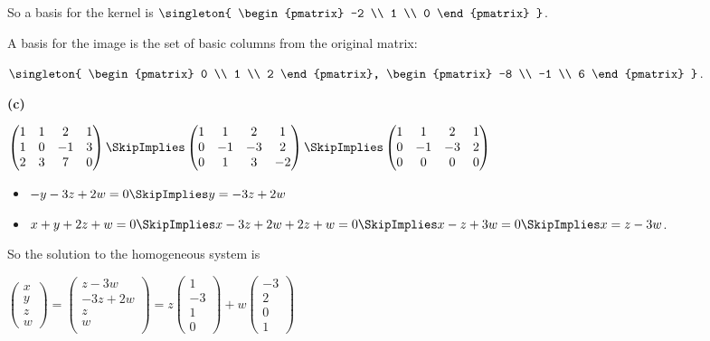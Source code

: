 \documentclass[oneside,12pt]{amsart}
\begin{document}
So a basis for the kernel is
$\singleton{
\begin{pmatrix}
-2 \\ 1 \\ 0
\end{pmatrix}
}$.

A basis for the image is the set of basic columns from the original matrix:

$\singleton{
\begin{pmatrix}
0 \\ 1 \\ 2
\end{pmatrix},
\begin{pmatrix}
-8 \\ -1 \\ 6
\end{pmatrix}
}$.

\bigskip

\textbf{(c)}

\bigskip

$
\begin{pmatrix}
1 & 1 & 2 & 1  \\
1 & 0 & -1 & 3  \\
2 & 3 & 7 & 0
\end{pmatrix}
\SkipImplies
\begin{pmatrix}
1 & 1 & 2 & 1 \\
0 & -1 & -3 & 2  \\
0 & 1 & 3 & -2
\end{pmatrix}
\SkipImplies
\begin{pmatrix}
1 & 1 & 2 & 1  \\
0 & -1 & -3 & 2 \\
0 & 0 & 0 & 0
\end{pmatrix}
$

\begin{itemize}
\item $-y -3z + 2w = 0 \SkipImplies y = -3z + 2w$
\item $x + y +2z + w = 0 \SkipImplies x -3z + 2w + 2z + w = 0 \SkipImplies x-z+3w = 0 \SkipImplies x = z-3w$.
\end{itemize}


So the solution to the homogeneous system is

$
\begin{pmatrix}
x \\
y \\
z \\
w
\end{pmatrix}
=
\begin{pmatrix}
z-3w \\
-3z+2w \\
z \\
w \\
\end{pmatrix}
=
z
\begin{pmatrix}
1 \\ -3 \\ 1 \\0
\end{pmatrix}
+
w
\begin{pmatrix}
-3 \\ 2 \\ 0 \\1
\end{pmatrix}
$
\end{document}
